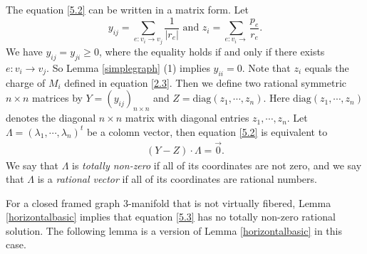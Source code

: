 \documentclass{amsart}
\numberwithin{equation}{section}
\theoremstyle{definition}
\begin{document}
The equation \eqref{5.2} can be written in a matrix form. Let 
$$y_{ij}=\sum_{e:v_i\to v_j}\frac{1}{|r_e|}\text{\ and\ }z_i=\sum_{e:v_i\to }\frac{p_e}{r_e}.$$ 
We have $y_{ij}=y_{ji}\geq 0$, where the equality holds if and only if there exists $e:v_i\to v_j$. So Lemma \ref{simplegraph} (1) implies $y_{ii}=0$. Note that $z_i$ equals the charge of $M_i$ defined in equation \eqref{2.3}.  Then we define two rational symmetric $n\times n$ matrices by $Y=(y_{ij})_{n\times n}$ and $Z=\text{diag}(z_1,\cdots,z_n)$. Here $\text{diag}(z_1,\cdots,z_n)$ denotes the diagonal $n\times n$ matrix with diagonal entries $z_1,\cdots,z_n$.  Let $\Lambda=(\lambda_1,\cdots,\lambda_n)^t$ be a colomn vector, then equation \eqref{5.2} is equivalent to 
\begin{align}\label{5.3}
(Y-Z)\cdot \Lambda=\vec{0}.
\end{align} We say that $\Lambda$ is {\it totally non-zero} if all of its coordinates are not zero, and we say that $\Lambda$ is a {\it rational vector} if all of its coordinates are rational numbers.

For a closed framed graph $3$-manifold that is not virtually fibered, Lemma \ref{horizontalbasic} implies that equation \eqref{5.3} has no totally non-zero rational solution. The following lemma is a version of Lemma \ref{horizontalbasic} in this case.
\end{document}
